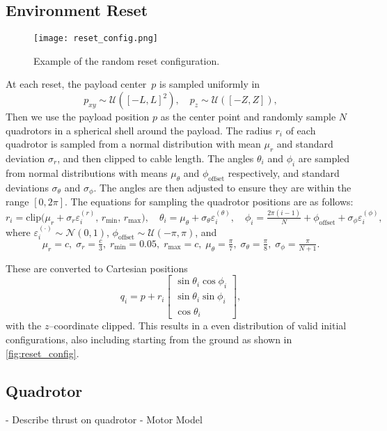 \subsection{Environment Reset}
\begin{figure}
    \centering
    \texttt{[image: reset\_config.png]}
    \caption{Example of the random reset configuration.}
    \label{fig:reset_config}
\end{figure}
At each reset, the payload center~$p$ is sampled uniformly in
\[
p_{xy}\sim\mathcal{U}([-L,L]^2),\quad p_z\sim\mathcal{U}([-Z,Z]),
\]
Then we use the payload position $p$ as the center point and randomly sample $N$ quadrotors in a spherical shell around the payload. The radius $r_i$ of each quadrotor is sampled from a normal distribution with mean $\mu_r$ and standard deviation $\sigma_r$, and then clipped to cable length. The angles $\theta_i$ and $\phi_i$ are sampled from normal distributions with means $\mu_\theta$ and $\phi_{\mathrm{offset}}$ respectively, and standard deviations $\sigma_\theta$ and $\sigma_\phi$. The angles are then adjusted to ensure they are within the range $[0, 2\pi]$. The equations for sampling the quadrotor positions are as follows:
\[
r_i = \mathrm{clip}\bigl(\mu_r+\sigma_r\varepsilon_i^{(r)},\,r_{\min},\,r_{\max}\bigr),\quad
\theta_i = \mu_\theta+\sigma_\theta\varepsilon_i^{(\theta)},\quad
\phi_i = \tfrac{2\pi(i-1)}{N} + \phi_{\mathrm{offset}} + \sigma_\phi\varepsilon_i^{(\phi)},
\]
where $\varepsilon_i^{(\cdot)}\!\sim\mathcal{N}(0,1)$, $\phi_{\mathrm{offset}}\!\sim\mathcal{U}(-\pi,\pi)$, and
\[
\mu_r=c,\;\sigma_r=\tfrac{c}{3},\;r_{\min}=0.05,\;r_{\max}=c,\;
\mu_\theta=\tfrac{\pi}{7},\;\sigma_\theta=\tfrac{\pi}{8},\;\sigma_\phi=\tfrac{\pi}{N+1}.
\]

These are converted to Cartesian positions
\[
q_i = p + r_i
\begin{bmatrix}
\sin\theta_i\cos\phi_i\\
\sin\theta_i\sin\phi_i\\
\cos\theta_i
\end{bmatrix},
\]
with the $z$–coordinate clipped. 
This results in a even distribution of valid initial configurations, also including starting from the ground as shown in \autoref{fig:reset_config}. 





\subsection{Quadrotor}
- Describe thrust on quadrotor
- Motor Model

